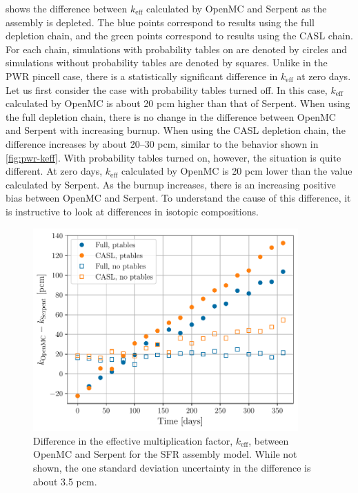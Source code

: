 \documentclass[3p,authoryear]{elsarticle}
\begin{document}
 shows the difference between $k_\text{eff}$ calculated by
OpenMC and Serpent as the assembly is depleted. The blue points correspond to
results using the full depletion chain, and the green points correspond to
results using the CASL chain. For each chain, simulations with probability
tables on are denoted by circles and simulations without probability tables are
denoted by squares. Unlike in the PWR pincell case, there is a statistically
significant difference in $k_\text{eff}$ at zero days. Let us first consider the
case with probability tables turned off. In this case, $k_\text{eff}$ calculated
by OpenMC is about 20 pcm higher than that of Serpent. When using the full
depletion chain, there is no change in the difference between OpenMC and Serpent
with increasing burnup. When using the CASL depletion chain, the difference
increases by about 20--30 pcm, similar to the behavior shown in
\cref{fig:pwr-keff}. With probability tables turned on, however, the situation
is quite different. At zero days, $k_\text{eff}$ calculated by OpenMC is 20 pcm
lower than the value calculated by Serpent. As the burnup increases, there is an
increasing positive bias between OpenMC and Serpent. To understand the cause of
this difference, it is instructive to look at differences in isotopic
compositions.
\begin{figure}[H]
  \centering
  \includegraphics[width=4in]{figures/sfr_keff.pdf}
  \caption{Difference in the effective multiplication factor, $k_\text{eff}$,
  between OpenMC and Serpent for the SFR assembly model. While not shown, the one
  standard deviation uncertainty in the difference is about 3.5 pcm.}
  \label{fig:sfr-keff}
\end{figure}
\end{document}
